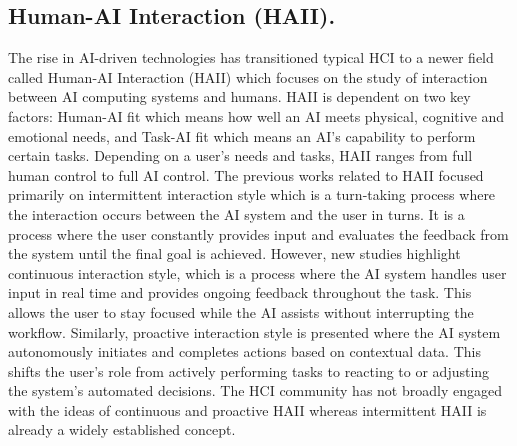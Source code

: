 \documentclass[conference]{IEEEtran}
\begin{document}
\subsection{Human-AI Interaction (HAII).}
The rise in AI-driven technologies has transitioned typical HCI to a newer field called Human-AI Interaction (HAII) which focuses on the study of interaction between AI computing systems and humans. HAII is dependent on two key factors: Human-AI fit which means how well an AI meets physical, cognitive and emotional needs, and Task-AI fit which means an AI’s capability to perform certain tasks. Depending on a user’s needs and tasks, HAII ranges from full human control to full AI control\cite{b3}. The previous works related to HAII focused primarily on intermittent interaction style which is a turn-taking process where the interaction occurs between the AI system and the user in turns. It is a process where the user constantly provides input and evaluates the feedback from the system until the final goal is achieved. However, new studies highlight continuous interaction style, which is a process where the AI system handles user input in real time and provides ongoing feedback throughout the task. This allows the user to stay focused while the AI assists without interrupting the workflow. Similarly, proactive interaction style is presented where the AI system autonomously initiates and completes actions based on contextual data. This shifts the user's role from actively performing tasks to reacting to or adjusting the system's automated decisions. The HCI community has not broadly engaged with the ideas of continuous and proactive HAII whereas intermittent HAII is already a widely established concept\cite{b4}.
\end{document}
